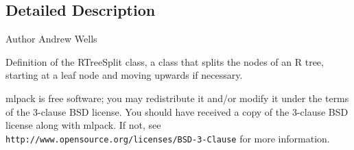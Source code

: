 \subsection{Detailed Description}
\begin{DoxyAuthor}{Author}
Andrew Wells
\end{DoxyAuthor}
Definition of the R\+Tree\+Split class, a class that splits the nodes of an R tree, starting at a leaf node and moving upwards if necessary.

mlpack is free software; you may redistribute it and/or modify it under the terms of the 3-\/clause B\+SD license. You should have received a copy of the 3-\/clause B\+SD license along with mlpack. If not, see {\tt http\+://www.\+opensource.\+org/licenses/\+B\+S\+D-\/3-\/\+Clause} for more information. 